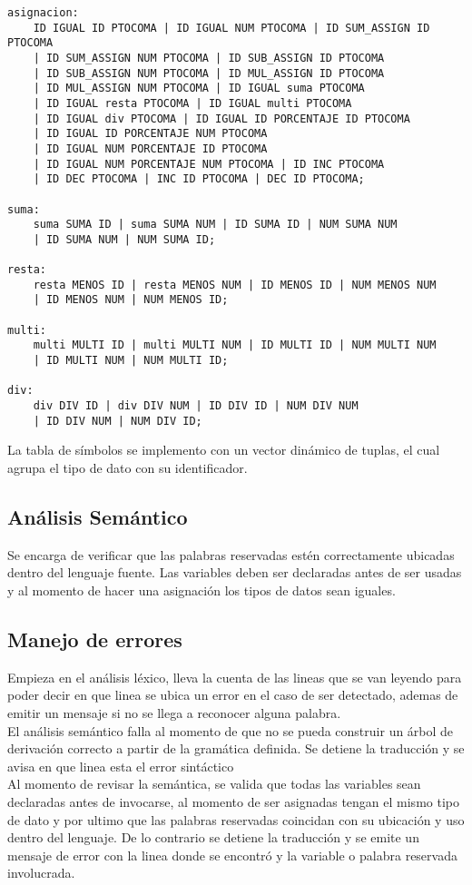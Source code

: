 \documentclass[aspectratio=169]{article}
\begin{document}
\begin{lstlisting}
asignacion:
	ID IGUAL ID PTOCOMA | ID IGUAL NUM PTOCOMA | ID SUM_ASSIGN ID PTOCOMA
	| ID SUM_ASSIGN NUM PTOCOMA | ID SUB_ASSIGN ID PTOCOMA
	| ID SUB_ASSIGN NUM PTOCOMA | ID MUL_ASSIGN ID PTOCOMA
	| ID MUL_ASSIGN NUM PTOCOMA | ID IGUAL suma PTOCOMA
	| ID IGUAL resta PTOCOMA | ID IGUAL multi PTOCOMA
	| ID IGUAL div PTOCOMA | ID IGUAL ID PORCENTAJE ID PTOCOMA
	| ID IGUAL ID PORCENTAJE NUM PTOCOMA
	| ID IGUAL NUM PORCENTAJE ID PTOCOMA
	| ID IGUAL NUM PORCENTAJE NUM PTOCOMA | ID INC PTOCOMA
	| ID DEC PTOCOMA | INC ID PTOCOMA | DEC ID PTOCOMA;

suma:
	suma SUMA ID | suma SUMA NUM | ID SUMA ID | NUM SUMA NUM
	| ID SUMA NUM | NUM SUMA ID;

resta:
	resta MENOS ID | resta MENOS NUM | ID MENOS ID | NUM MENOS NUM
	| ID MENOS NUM | NUM MENOS ID;

multi:
	multi MULTI ID | multi MULTI NUM | ID MULTI ID | NUM MULTI NUM
	| ID MULTI NUM | NUM MULTI ID;

div:
	div DIV ID | div DIV NUM | ID DIV ID | NUM DIV NUM
	| ID DIV NUM | NUM DIV ID;

\end{lstlisting}

La tabla de símbolos se implemento con un vector dinámico de tuplas, el cual agrupa el tipo de dato
con su identificador.


\subsection{An\'alisis Sem\'antico}

Se encarga de verificar que las palabras reservadas estén correctamente ubicadas dentro del lenguaje fuente.
Las variables deben ser declaradas antes de ser usadas y al momento de hacer una asignación los
tipos de datos sean iguales.

\subsection{Manejo de errores}

Empieza en el análisis léxico, lleva la cuenta de las lineas que se van leyendo para poder decir
en que linea se ubica un error en el caso de ser detectado, ademas de emitir un mensaje si no se llega
a reconocer alguna palabra.\\

El análisis semántico falla al momento de que no se pueda construir un árbol de derivación correcto
a partir de la gramática definida. Se detiene la traducción y se avisa en que linea esta el error sintáctico\\

Al momento de revisar la semántica, se valida que todas las variables sean declaradas antes de invocarse,
al momento de ser asignadas tengan el mismo tipo de dato y por ultimo que las palabras reservadas coincidan
con su ubicación y uso dentro del lenguaje. De lo contrario se detiene la traducción y se emite un mensaje
de error con la linea donde se encontró y la variable o palabra reservada involucrada.
\end{document}
